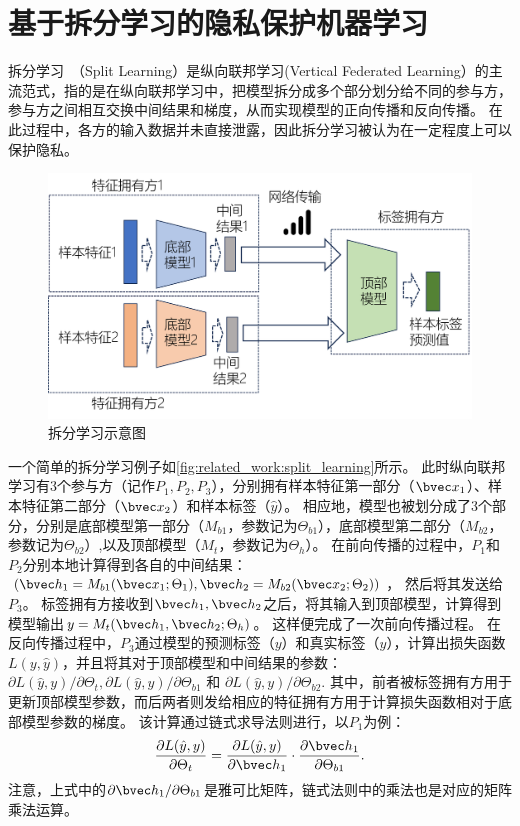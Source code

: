 \section{基于拆分学习的隐私保护机器学习}
%
拆分学习~\cite{vepakomma2018split,poirot2019split}（Split Learning）是纵向联邦学习(Vertical Federated Learning）的主流范式，指的是在纵向联邦学习中，把模型拆分成多个部分划分给不同的参与方，参与方之间相互交换中间结果和梯度，从而实现模型的正向传播和反向传播。
%
在此过程中，各方的输入数据并未直接泄露，因此拆分学习被认为在一定程度上可以保护隐私。

\begin{figure}[h]
    \centering
    \includegraphics[width=0.8\linewidth]{Z_Resources/拆分学习示意图.png}
    \caption{拆分学习示意图}
    \label{fig:related_work:split_learning}
\end{figure}

一个简单的拆分学习例子如\autoref{fig:related_work:split_learning}所示。
%
此时纵向联邦学习有3个参与方（记作$P_1, P_2, P_3$），分别拥有样本特征第一部分（$\bvec x_1$）、样本特征第二部分（$\bvec x_2$）和样本标签（$\hat y$）。
%
相应地，模型也被划分成了3个部分，分别是底部模型第一部分（$M_{b1}$，参数记为$\Theta_{b1}$），底部模型第二部分（$M_{b2}$，参数记为$\Theta_{b2}$）,以及顶部模型（$M_t$，参数记为$\Theta_h$）。
%
在前向传播的过程中，$P_1$和$P_2$分别本地计算得到各自的中间结果：
$
    \left(
        \bvec h_1 = M_{b1}(\bvec x_1;\Theta_1),
        \bvec h_2 = M_{b2}(\bvec x_2;\Theta_2)
    \right)
$，
然后将其发送给$P_3$。
%
标签拥有方接收到$\bvec h_1, \bvec h_2$之后，将其输入到顶部模型，计算得到模型输出$y = M_t(\bvec h_1, \bvec h_2; \Theta_h)$。
%
这样便完成了一次前向传播过程。
%
%
在反向传播过程中，$P_3$通过模型的预测标签（$y$）和真实标签（$\hat y$），计算出损失函数$L(y, \hat y)$，并且将其对于顶部模型和中间结果的参数：${\partial L(\hat y, y)}/{\partial \Theta_t}, {\partial L(\hat y, y)}/{\partial \Theta_{b1}}$ 和 ${\partial L(\hat y, y)}/{\partial \Theta_{b2}}$.
%
其中，前者被标签拥有方用于更新顶部模型参数，而后两者则发给相应的特征拥有方用于计算损失函数相对于底部模型参数的梯度。
%
该计算通过链式求导法则进行，以$P_1$为例：
\begin{equation}
    \dfrac{\partial L(\hat y, y)}{\partial \Theta_t} = \dfrac{\partial L(\hat y, y)}{\partial \bvec h_1}\cdot \dfrac{\partial \bvec h_1}{\partial \Theta_{b1}}.
\end{equation}
%
注意，上式中的${\partial \bvec h_1}/{\partial \Theta_{b1}}$是雅可比矩阵，链式法则中的乘法也是对应的矩阵乘法运算。

